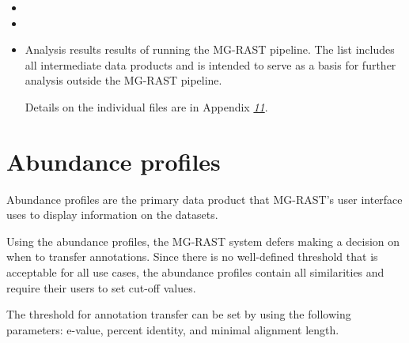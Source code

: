 \documentclass[letterpaper,10pt,english]{sphinxmanual}
\begin{document}
\begin{itemize}
\item {} 

\item {} 

\item {} 
Analysis results \textendash{} results of running the MG-RAST pipeline. The list
includes all intermediate data products and is intended to serve as a
basis for further analysis outside the MG-RAST pipeline.

Details on the individual files are in Appendix
{\hyperref[\detokenize{user_manual:chapter:downloads}]{\emph{11}}}.

\end{itemize}


\section{Abundance profiles}
\label{\detokenize{user_manual:abundance-profiles}}
Abundance profiles are the primary data product that MG-RAST’s user
interface uses to display information on the datasets.

Using the abundance profiles, the MG-RAST system defers making a
decision on when to transfer annotations. Since there is no well-defined
threshold that is acceptable for all use cases, the abundance profiles
contain all similarities and require their users to set cut-off values.

The threshold for annotation transfer can be set by using the following
parameters: e-value, percent identity, and minimal alignment length.
\end{document}
